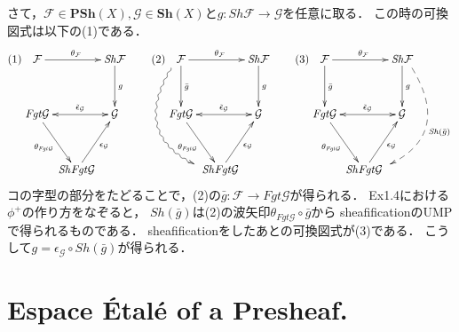 \documentclass[a4paper]{jsarticle}
\newcommand{\shF}{\mathcal{F}}
\newcommand{\shG}{\mathcal{G}}
\newcommand{\Sh}{\mathbf{Sh}}
\newcommand{\PSh}{\mathbf{PSh}}
\newcommand{\ftorSh}{\mathit{Sh}}
\newcommand{\ftorFgt}{\mathit{Fgt}}
\begin{document}
    さて，$\shF \in \PSh(X), \shG \in \Sh(X)$と$g: \ftorSh \shF \to \shG$を任意に取る．
    この時の可換図式は以下の(1)である．
    \[
    (1)
    \xymatrix@C=2pt@R=35pt
    {
    \shF \ar[rr]^{\theta_{\shF}} & {} & \ftorSh \shF \ar[d]^{g} \\
    \ftorFgt \shG \ar@{<->}[rr]^-{\tilde{\epsilon}_{\shG}} \ar[rd]_-{\theta_{\ftorFgt \shG}} & {} & \shG \\
    {} & \ftorSh \ftorFgt \shG \ar[ru]_-{\epsilon_{\shG}} & {}
    }
    \hspace{20pt}
    (2)
    \xymatrix@C=2pt@R=35pt
    {
    \shF \ar[rr]^{\theta_{\shF}} \ar[d]^{\bar{g}} \ar@<-2mm>@/_12mm/@{~>}[rdd] & {} & \ftorSh \shF \ar[d]^{g} \\
    \ftorFgt \shG \ar@{<->}[rr]^-{\tilde{\epsilon}_{\shG}} \ar[rd]_-{\theta_{\ftorFgt \shG}} & {} & \shG \\
    {} & \ftorSh \ftorFgt \shG \ar[ru]_-{\epsilon_{\shG}} & {}
    }
    \hspace{20pt}
    (3)
    \xymatrix@C=2pt@R=35pt
    {
    \shF \ar[rr]^{\theta_{\shF}} \ar[d]^{\bar{g}} & {} & \ftorSh \shF \ar[d]^{g} \ar@<2mm>@/^12mm/@{-->}[ldd]^{\ftorSh(\bar{g})} \\
    \ftorFgt \shG \ar@{<->}[rr]^-{\tilde{\epsilon}_{\shG}} \ar[rd]_-{\theta_{\ftorFgt \shG}} & {} & \shG \\
    {} & \ftorSh \ftorFgt \shG \ar[ru]_-{\epsilon_{\shG}} & {}
    }
    \]
    コの字型の部分をたどることで，(2)の$\bar{g}: \shF \to \ftorFgt \shG$が得られる．
    Ex1.4における$\phi^+$の作り方をなぞると，
    $\ftorSh(\bar{g})$は(2)の波矢印$\theta_{\ftorFgt \shG} \circ \bar{g}$から
    sheafificationのUMPで得られるものである．
    sheafificationをしたあとの可換図式が(3)である．
    こうして$g=\epsilon_{\shG} \circ \ftorSh(\bar{g})$が得られる．

\section{Espace \'Etal\'e of a Presheaf.} %
\end{document}
